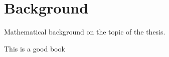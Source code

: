 

\chapter{Background}
Mathematical background on the topic of the thesis.

This is a good book \cite{ulin}

